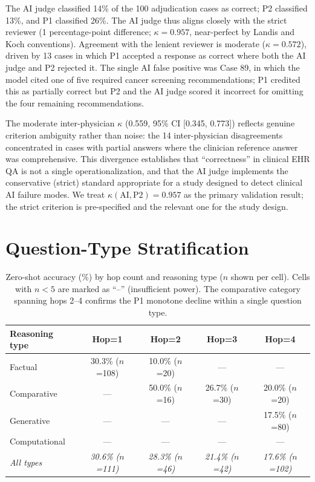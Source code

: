 \documentclass{article}
\begin{document}
The AI judge classified 14\% of the 100 adjudication cases as correct; P2
classified 13\%, and P1 classified 26\%. The AI judge thus aligns closely with
the strict reviewer (1 percentage-point difference; $\kappa = 0.957$, near-perfect
by Landis and Koch conventions). Agreement with the lenient reviewer is moderate
($\kappa = 0.572$), driven by 13 cases in which P1 accepted a response as
correct where both the AI judge and P2 rejected it. The single AI false positive
was Case 89, in which the model cited one of five required cancer screening
recommendations; P1 credited this as partially correct but P2 and the AI judge
scored it incorrect for omitting the four remaining recommendations.

The moderate inter-physician $\kappa$ (0.559, 95\% CI [0.345, 0.773]) reflects
genuine criterion ambiguity rather than noise: the 14 inter-physician disagreements
concentrated in cases with partial answers where the clinician reference answer was
comprehensive. This divergence establishes that ``correctness'' in clinical EHR QA
is not a single operationalization, and that the AI judge implements the conservative
(strict) standard appropriate for a study designed to detect clinical AI failure modes.
We treat $\kappa(\text{AI}, \text{P2}) = 0.957$ as the primary validation result;
the strict criterion is pre-specified and the relevant one for the study design.

\section{Question-Type Stratification}
\label{app:qtype}

\begin{table}[h]
\centering
\caption{Zero-shot accuracy (\%) by hop count and reasoning type ($n$ shown per cell). Cells with $n < 5$ are marked as ``--'' (insufficient power). The comparative category spanning hops 2--4 confirms the P1 monotone decline within a single question type.}
\label{tab:qtype}
\small
\begin{tabular}{@{}lcccc@{}}
\toprule
\textbf{Reasoning type} & \textbf{Hop=1} & \textbf{Hop=2} & \textbf{Hop=3} & \textbf{Hop=4} \\
\midrule
Factual      & 30.3\% ($n$=108) & 10.0\% ($n$=20) & --- & --- \\
Comparative  & ---              & 50.0\% ($n$=16) & 26.7\% ($n$=30) & 20.0\% ($n$=20) \\
Generative   & ---              & ---             & ---            & 17.5\% ($n$=80) \\
Computational& ---              & ---             & ---            & --- \\
\midrule
\textit{All types} & \textit{30.6\% ($n$=111)} & \textit{28.3\% ($n$=46)} & \textit{21.4\% ($n$=42)} & \textit{17.6\% ($n$=102)} \\
\bottomrule
\end{tabular}
\end{table}
\end{document}

